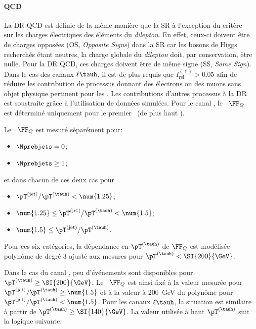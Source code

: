 \paragraph{QCD}
La DR QCD est définie de la même manière que la SR à l'exception du critère sur les charges électriques des éléments du \emph{dilepton}.
En effet, ceux-ci doivent être de charges opposées (OS, \emph{Opposite Signs}) dans la SR car les bosons de Higgs recherchés étant neutres, la charge globale du \emph{dilepton} doit, par conservation, être nulle.
Pour la DR QCD, ces charges doivent être de même signe (SS, \emph{Same Sign}).
Dans le cas des canaux $\ell\tauh$, il est de plus requis que $I_\text{rel}^{(\ell)} > \num{0.05}$ afin de réduire les contribution de processus donnant des électrons ou des muons sans objet physique pertinent pour les \fakefactors.
Les contributions d'autres processus à la DR est soustraite grâce à l'utilisation de données simulées.
Pour le canal \tauh\tauh, le \fakefactor\ $\FF_Q$ est déterminé uniquement pour le premier \tauh\ (de plus haut \pT).
\par
Le \fakefactor\ $\FF_Q$ est mesuré séparément pour:
\begin{itemize}
\item $\Nprebjets=0$;
\item $\Nprebjets\geq1$;
\end{itemize}
et dans chacun de ces deux cas pour
\begin{itemize}
\item $\pT^{(\text{jet})}/\pT^{(\tauh)} < \num{1.25}$;
\item $\num{1.25} \leq \pT^{(\text{jet})}/\pT^{(\tauh)} < \num{1.5}$;
\item $\num{1.5} \leq \pT^{(\text{jet})}/\pT^{(\tauh)}$.
\end{itemize}
Pour ces six catégories, la dépendance en $\pT^{(\tauh)}$ de $\FF_Q$ est modélisée polynôme de degré 3 ajusté aux mesures pour $\pT^{(\tauh)}<\SI{200}{\GeV}$.
\par
Dans le cas du canal \tauh\tauh, peu d'événements sont disponibles pour $\pT^{(\tauh)}\geq\SI{200}{\GeV}$.
Le \fakefactor\ $\FF_Q$ est ainsi fixé à la valeur mesurée pour $\pT^{(\text{jet})}/\pT^{(\tauh)} \geq \num{1.5}$ et à la valeur à \SI{200}{\GeV} du polynôme pour $\pT^{(\text{jet})}/\pT^{(\tauh)} < \num{1.5}$.
Pour les canaux $\ell\tauh$, la situation est similaire à partir de $\pT^{(\tauh)}\geq\SI{140}{\GeV}$.
La valeur utilisée à haut $\pT^{(\tauh)}$ suit la logique suivante:
